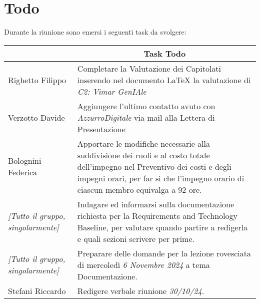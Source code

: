 \section{Todo}

Durante la riunione sono emersi i seguenti task da svolgere:

\vspace{0.5cm}

\begin{table}[htbp]
\begin{tabular}{|p{}|p{}|}
    \hline
    \rowcolor[gray]{0.9}
    \multicolumn{1}{|c|}{\textbf{Assegnatario}} & \multicolumn{1}{|c|}{\textbf{Task Todo}} \\
    \hline
    Righetto Filippo & Completare la Valutazione dei Capitolati inserendo nel documento LaTeX la valutazione di \emph{C2: Vimar GenIAle} \\
    \hline
    Verzotto Davide & Aggiungere l'ultimo contatto avuto con \emph{AzzurroDigitale} via mail alla Lettera di Presentazione \\
    \hline
    Bolognini Federica & Apportare le modifiche necessarie alla suddivisione dei ruoli e al costo totale dell'impegno nel Preventivo 
    dei costi e degli impegni orari, per far sì che l'impegno orario di ciascun membro equivalga a 92 ore. \\
    \hline
    \emph{[Tutto il gruppo, singolarmente]} & Indagare ed informarsi sulla documentazione richiesta per la Requirements and Technology Baseline, per 
    valutare quando partire a redigerla e quali sezioni scrivere per prime. \\
    \hline
    \emph{[Tutto il gruppo, singolarmente]} & Preparare delle domande per la lezione rovesciata di mercoledì \emph{6 Novembre 2024} a tema Documentazione. \\
    \hline
    Stefani Riccardo & Redigere verbale riunione \emph{30/10/24}. \\
    \hline
\end{tabular}
\end{table}
